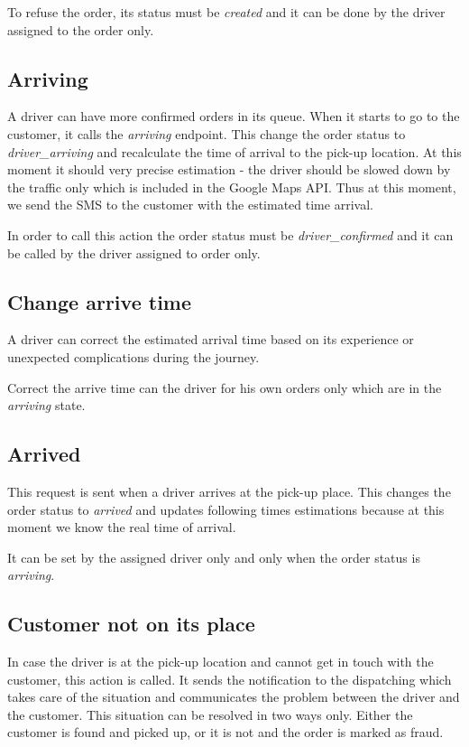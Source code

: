 			To refuse the order, its status must be \textit{created} and it can be done by the driver assigned to the order only.
		\subsection{Arriving}
			A driver can have more confirmed orders in its queue. When it starts to go to the customer, it calls the \textit{arriving} endpoint. This change the order status to \textit{driver\_arriving} and recalculate the time of arrival to the pick-up location. At this moment it should very precise estimation - the driver should be slowed down by the traffic only which is included in the Google Maps API. Thus at this moment, we send the SMS to the customer with the estimated time arrival.
			
			In order to call this action the order status must be \textit{driver\_confirmed} and it can be called by the driver assigned to order only. 
		\subsection{Change arrive time}
			A driver can correct the estimated arrival time based on its experience or unexpected complications during the journey.
			
			Correct the arrive time can the driver for his own orders only which are in the \textit{arriving} state.
		\subsection{Arrived}
			This request is sent when a driver arrives at the pick-up place. This changes the order status to \textit{arrived} and updates following times estimations because at this moment we know the real time of arrival.
			
			It can be set by the assigned driver only and only when the order status is \textit{arriving}.
		\subsection{Customer not on its place}
			In case the driver is at the pick-up location and cannot get in touch with the customer, this action is called. It sends the notification to the dispatching which takes care of the situation and communicates the problem between the driver and the customer. This situation can be resolved in two ways only. Either the customer is found and picked up, or it is not and the order is marked as fraud. 
			
